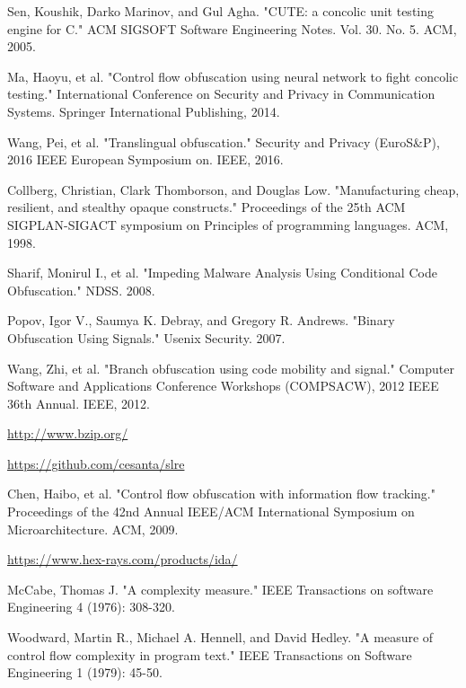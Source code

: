 \documentclass[lnicst]{svmultln}
\begin{document}
\begin{thebibliography}{5}

 Sen, Koushik, Darko Marinov, and Gul Agha. "CUTE: a concolic unit testing engine for C." ACM SIGSOFT Software Engineering Notes. Vol. 30. No. 5. ACM, 2005.

 Ma, Haoyu, et al. "Control flow obfuscation using neural network to fight concolic testing." International Conference on Security and Privacy in Communication Systems. Springer International Publishing, 2014.

 Wang, Pei, et al. "Translingual obfuscation." Security and Privacy (EuroS\&P), 2016 IEEE European Symposium on. IEEE, 2016.

 Collberg, Christian, Clark Thomborson, and Douglas Low. "Manufacturing cheap, resilient, and stealthy opaque constructs." Proceedings of the 25th ACM SIGPLAN-SIGACT symposium on Principles of programming languages. ACM, 1998.

 Sharif, Monirul I., et al. "Impeding Malware Analysis Using Conditional Code Obfuscation." NDSS. 2008.

 Popov, Igor V., Saumya K. Debray, and Gregory R. Andrews. "Binary Obfuscation Using Signals." Usenix Security. 2007.

 Wang, Zhi, et al. "Branch obfuscation using code mobility and signal." Computer Software and Applications Conference Workshops (COMPSACW), 2012 IEEE 36th Annual. IEEE, 2012.

 \url{http://www.bzip.org/}

 \url{https://github.com/cesanta/slre}

 Chen, Haibo, et al. "Control flow obfuscation with information flow tracking." Proceedings of the 42nd Annual IEEE/ACM International Symposium on Microarchitecture. ACM, 2009.

 \url{https://www.hex-rays.com/products/ida/}

 McCabe, Thomas J. "A complexity measure." IEEE Transactions on software Engineering 4 (1976): 308-320.

 Woodward, Martin R., Michael A. Hennell, and David Hedley. "A measure of control flow complexity in program text." IEEE Transactions on Software Engineering 1 (1979): 45-50.


\end{thebibliography}
%
\end{document}
